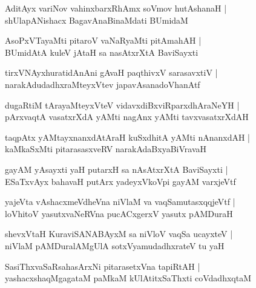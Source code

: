 \documentclass[twoside,12pt,openright]{book}
\newcounter{shloka}[chapter]
\begin{document}
\begin{shloka}%
AditAyx variNov vahinxbarxRhAmx soVmov hutAshanaH |\\
shUlapANishacx BagavAnaBinaMdati BUmidaM 
\end{shloka}

\begin{shloka}%
AsoPxVTayaMti pitaroV vaNaRyaMti pitAmahAH |\\
BUmidAtA kuleV jAtaH sa nasAtxrXtA BaviSayxti
\end{shloka}

\begin{shloka}%
tirxVNAyxhuratidAnAni gAvaH paqthivxV sarasavxtiV |\\
narakAdudadhxraMteyxVtev japavAsanadoVhanAtf
\end{shloka}

\begin{shloka}%
dugaRtiM tArayaMteyxVteV vidavxdiBxviRparxdhAraNeYH |\\
pArxvaqtA vasatxrXdA yAMti nagAnx yAMti tavxvasatxrXdAH 
\end{shloka}

\begin{shloka}%
taqpAtx yAMtayxnanxdAtAraH kuSxdhitA yAMti nAnanxdAH |\\
kaMkaSxMti pitarasasxveRV narakAdaBxyaBiVravaH
\end{shloka}

\begin{shloka}%
gayAM yAsayxti yaH putarxH sa nAsAtxrXtA BaviSayxti |\\
ESaTxvAyx bahavaH putArx yadeyxVkoVpi gayAM varxjeVtf
\end{shloka}

\begin{shloka}%
yajeVta vAshacxmeVdheVna niVlaM va vaqSamutasxqqjeVtf |\\
loVhitoV yasutxvaNeRVna pucACxgerxV yasutx pAMDuraH 
\end{shloka}

\begin{shloka}%
shevxVtaH KuraviSANABAyxM sa niVloV vaqSa ucayxteV |\\
niVlaM pAMDuralAMgUlA sotxVyamudadhxrateV tu yaH 
\end{shloka}

\begin{shloka}%
SasiThxvaSaRsahasArxNi pitarasetxVna tapiRtAH |\\
yashacxshaqMgagataM paMkaM kUlAtitxSaThxti coVdadhxqtaM 
\end{shloka}
\end{document}
